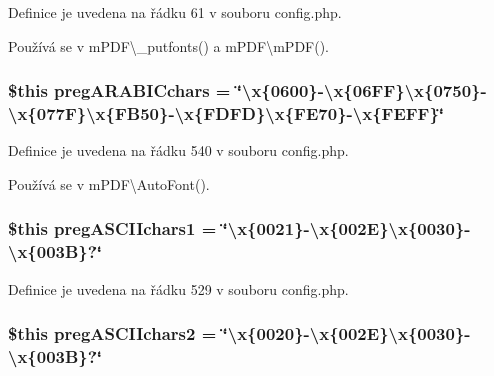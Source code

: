 Definice je uvedena na řádku 61 v souboru config.\-php.



Používá se v m\-P\-D\-F\textbackslash{}\-\_\-putfonts() a m\-P\-D\-F\textbackslash{}m\-P\-D\-F().

\hypertarget{config_8php_affc7d9af6591527aaf7f6b2031ff3bb9}{
\subsubsection[{preg\-A\-R\-A\-B\-I\-Cchars}]{\setlength{\rightskip}{0pt plus 5cm}\$this preg\-A\-R\-A\-B\-I\-Cchars = \char`\"{}\textbackslash{}x\{0600\}-\/\textbackslash{}x\{06\-F\-F\}\textbackslash{}x\{0750\}-\/\textbackslash{}x\{077\-F\}\textbackslash{}x\{\-F\-B50\}-\/\textbackslash{}x\{\-F\-D\-F\-D\}\textbackslash{}x\{\-F\-E70\}-\/\textbackslash{}x\{\-F\-E\-F\-F\}\char`\"{}}}\label{config_8php_affc7d9af6591527aaf7f6b2031ff3bb9}


Definice je uvedena na řádku 540 v souboru config.\-php.



Používá se v m\-P\-D\-F\textbackslash{}\-Auto\-Font().

\hypertarget{config_8php_a6eacffa92e9788aab5737861b6a68ce2}{
\subsubsection[{preg\-A\-S\-C\-I\-Ichars1}]{\setlength{\rightskip}{0pt plus 5cm}\$this preg\-A\-S\-C\-I\-Ichars1 = \char`\"{}\textbackslash{}x\{0021\}-\/\textbackslash{}x\{002\-E\}\textbackslash{}x\{0030\}-\/\textbackslash{}x\{003\-B\}?\char`\"{}}}\label{config_8php_a6eacffa92e9788aab5737861b6a68ce2}


Definice je uvedena na řádku 529 v souboru config.\-php.

\hypertarget{config_8php_ad185c919bbe911f2b8d225c1042cb9fd}{
\subsubsection[{preg\-A\-S\-C\-I\-Ichars2}]{\setlength{\rightskip}{0pt plus 5cm}\$this preg\-A\-S\-C\-I\-Ichars2 = \char`\"{}\textbackslash{}x\{0020\}-\/\textbackslash{}x\{002\-E\}\textbackslash{}x\{0030\}-\/\textbackslash{}x\{003\-B\}?\char`\"{}}}\label{config_8php_ad185c919bbe911f2b8d225c1042cb9fd}


